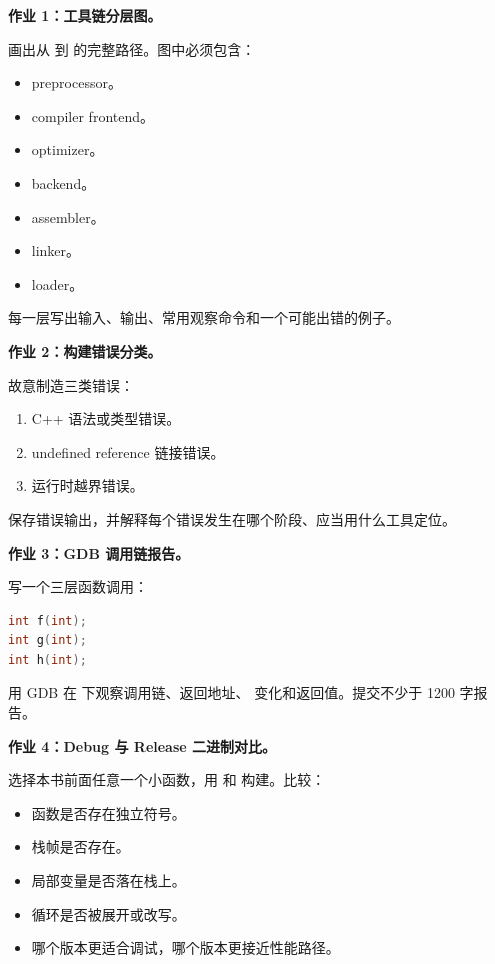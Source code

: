 \begin{exercisebox}
\textbf{作业 1：工具链分层图。}

画出从  到  的完整路径。图中必须包含：

\begin{itemize}
  \item preprocessor。
  \item compiler frontend。
  \item optimizer。
  \item backend。
  \item assembler。
  \item linker。
  \item loader。
\end{itemize}

每一层写出输入、输出、常用观察命令和一个可能出错的例子。

\textbf{作业 2：构建错误分类。}

故意制造三类错误：

\begin{enumerate}
  \item C++ 语法或类型错误。
  \item undefined reference 链接错误。
  \item 运行时越界错误。
\end{enumerate}

保存错误输出，并解释每个错误发生在哪个阶段、应当用什么工具定位。

\textbf{作业 3：GDB 调用链报告。}

写一个三层函数调用：

\begin{lstlisting}[language=C++]
int f(int);
int g(int);
int h(int);
\end{lstlisting}

用 GDB 在  下观察调用链、返回地址、 变化和返回值。提交不少于 1200 字报告。

\textbf{作业 4：Debug 与 Release 二进制对比。}

选择本书前面任意一个小函数，用  和  构建。比较：

\begin{itemize}
  \item 函数是否存在独立符号。
  \item 栈帧是否存在。
  \item 局部变量是否落在栈上。
  \item 循环是否被展开或改写。
  \item 哪个版本更适合调试，哪个版本更接近性能路径。
\end{itemize}


\end{exercisebox}
